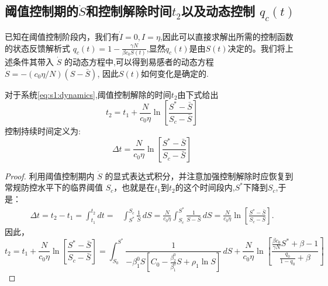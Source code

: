 \documentclass[lang=cn,a4paper,newtx]{elegantpaper}
\numberwithin{equation}{section}
\theoremstyle{plain}
\begin{document}
\subsection{阈值控制期的$\dot{S}$和控制解除时间$t_2$以及动态控制 $q_c(t)$}
已知在阈值控制阶段内，我们有$\dot{I}=0,I=\eta$,因此可以直接求解出所需的控制函数的状态反馈解析式 $q_c(t)=1-\frac{\gamma N}{\beta c_0 S(t)}$,显然$q_c(t)$是由$S(t)$决定的。我们将上述条件其带入 $\dot{S}$ 的动态方程中,可以得到易感者的动态方程$\dot{S}=-(c_0\eta/N)(S-\bar S)$,
因此$S(t)$如何变化是确定的.
\begin{theorem}
    对于系统\eqref{eq:s1:dynamics},阈值控制解除的时间$t_2$由下式给出
    \begin{equation}
    t_2
    =
    t_1+
    \frac{N}{c_0 \eta}
    \ln \left[
    \frac{S^*-\bar S}
    {S_c-\bar S}
    \right]
    \label{eq:s1:t2}
    \end{equation}
    控制持续时间定义为:
        \begin{equation}
        \Delta t = \frac{N}{c_0 \eta}
        \ln \left[
        \frac{S^*-\bar S}
        {S_c-\bar S}
        \right]
    \end{equation}
\end{theorem}
\begin{proof}   
    利用阈值控制期内 $\dot{S}$ 的显式表达式积分，并注意加强控制解除时应恢复到常规防控水平下的临界阈值 $S_c$，也就是在$t_1$到$t_2$的这个时间段内,$S^*$下降到$S_c$,于是：
    \begin{align*}
        \Delta t=t_2-t_1=\int_{t_1}^{t_2} dt=&\int_{S^*}^{S_c} \frac{1}{\dot{S}} \, dS
        =\frac{N}{c_0\eta}\int_{S_c}^{S^*} \frac{1}{S-\bar S}\,dS
        =\frac{N}{c_0 \eta}
        \ln \left[
        \frac{S^*-\bar S}
        {S_c-\bar S}
        \right].
    \end{align*}
    因此，
    \begin{equation*}
    t_2
    =
    t_1+
    \frac{N}{c_0 \eta}
    \ln \left[
    \frac{S^*-\bar S}
    {S_c-\bar S}
    \right]=\int_{S_0}^{S^*}
    \frac{1}{
    -\beta_1^0S\left[
    C_0-\frac{\beta_2^0}{\beta_1^0}S+\rho_1\ln S
    \right]
    }\,dS + \frac{N}{c_0 \eta}
    \ln \left[
    \frac{\frac{\beta c_0}{\gamma N}S^*+ \beta-1}
    {\frac{q_0}{1-q_0}+ \beta}
    \right]
    \end{equation*}
\end{proof}
\end{document}
